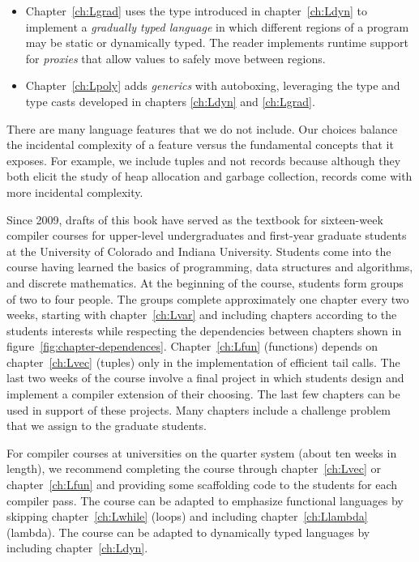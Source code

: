 \documentclass[7x10]{TimesAPriori_MIT}%
\def\pythonEd{1}
\def\edition{1}
\newcommand{\pythonColor}[0]{}
\newcommand{\python}[1]{{\if\edition\pythonEd\pythonColor #1\fi}}
\numberwithin{theorem}{chapter}
\numberwithin{definition}{chapter}
\numberwithin{equation}{chapter}
\begin{document}
\begin{itemize}
\item Chapter~\ref{ch:Lgrad} uses the  type introduced in
  chapter~\ref{ch:Ldyn} to implement a \emph{gradually typed language}
  in which different regions of a program may be static or dynamically
  typed. The reader implements runtime support for \emph{proxies} that
  allow values to safely move between regions.
\item Chapter~\ref{ch:Lpoly} adds \emph{generics} with autoboxing,
  leveraging the  type and type casts developed in chapters
  \ref{ch:Ldyn} and \ref{ch:Lgrad}.
\end{itemize}

There are many language features that we do not include. Our choices
balance the incidental complexity of a feature versus the fundamental
concepts that it exposes. For example, we include tuples and not
records because although they both elicit the study of heap allocation and
garbage collection, records come with more incidental complexity.

Since 2009, drafts of this book have served as the textbook for
sixteen-week compiler courses for upper-level undergraduates and
first-year graduate students at the University of Colorado and Indiana
University.
%
Students come into the course having learned the basics of
programming, data structures and algorithms, and discrete
mathematics.
%
At the beginning of the course, students form groups of two to four
people.  The groups complete approximately one chapter every two
weeks, starting with chapter~\ref{ch:Lvar} and including chapters
according to the students interests while respecting the dependencies
between chapters shown in
figure~\ref{fig:chapter-dependences}. Chapter~\ref{ch:Lfun}
(functions) depends on chapter~\ref{ch:Lvec} (tuples) only in the
implementation of efficient tail calls.
%
The last two weeks of the course involve a final project in which
students design and implement a compiler extension of their choosing.
The last few chapters can be used in support of these projects.  Many
chapters include a challenge problem that we assign to the graduate
students.

For compiler courses at universities on the quarter system
(about ten weeks in length), we recommend completing the course
through chapter~\ref{ch:Lvec} or chapter~\ref{ch:Lfun} and providing
some scaffolding code to the students for each compiler pass.
%
The course can be adapted to emphasize functional languages by
skipping chapter~\ref{ch:Lwhile} (loops) and including
chapter~\ref{ch:Llambda} (lambda). The course can be adapted to
dynamically typed languages by including chapter~\ref{ch:Ldyn}.
%
\end{document}
